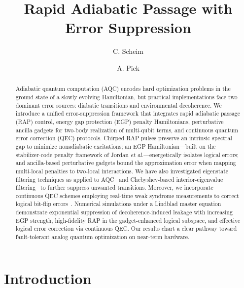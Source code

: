 \documentclass[reprint, amsmath,amssymb,nofootinbib, aps,superscriptaddress,longbibliography]{revtex4-1}
\begin{document}
\raggedright

\title{Rapid Adiabatic Passage with Error Suppression}
\author{C. Scheim}
\author{A. Pick}
\begin{abstract}
Adiabatic quantum computation (AQC) encodes hard optimization problems in the ground state of a slowly evolving Hamiltonian, but practical implementations face two dominant error sources: diabatic transitions and environmental decoherence. We introduce a unified error‐suppression framework that integrates rapid adiabatic passage (RAP) control, energy gap protection (EGP) penalty Hamiltonians, perturbative ancilla gadgets for two-body realization of multi-qubit terms, and continuous quantum error correction (QEC) protocols. Chirped RAP pulses preserve an intrinsic spectral gap to minimize nonadiabatic excitations; an EGP Hamiltonian—built on the stabilizer-code penalty framework of Jordan \textit{et al.}\cite{jordan2006error}—energetically isolates logical errors; and ancilla-based perturbative gadgets bound the approximation error when mapping multi-local penalties to two-local interactions. We have also investigated eigenstate filtering techniques as applied to AQC~\cite{eigenstate_filtering_and_AQC} and Chebyshev-based interior-eigenvalue filtering~\cite{chebyshev_filterring} to further suppress unwanted transitions. Moreover, we incorporate continuous QEC schemes employing real-time weak syndrome measurements to correct logical bit-flip errors~\cite{vanhandel2018optimal,atalaya2021continuous}. Numerical simulations under a Lindblad master equation demonstrate exponential suppression of decoherence-induced leakage with increasing EGP strength, high-fidelity RAP in the gadget-enhanced logical subspace, and effective logical error correction via continuous QEC. Our results chart a clear pathway toward fault-tolerant analog quantum optimization on near-term hardware.
\end{abstract}


\maketitle

\section{Introduction}
\end{document}
